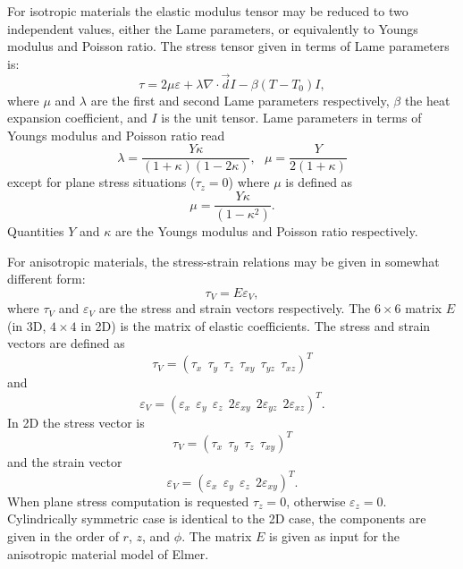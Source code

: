 \begin{versiona}
For isotropic materials the elastic modulus tensor may be reduced to
two independent values, either the Lame parameters, or equivalently
to Youngs modulus and Poisson ratio. The stress tensor given 
in terms of Lame parameters is:
\begin{equation}
\tau = 2 \mu \varepsilon + \lambda\nabla\cdot\Vec{d} I - \beta(T-T_0)I,
\end{equation}
where $\mu$ and $\lambda$ are the first and second Lame parameters respectively,
$\beta$ the heat expansion coefficient,
and $I$ is the unit tensor. Lame parameters in terms of Youngs modulus and
Poisson ratio read
\begin{equation}
 \lambda = \frac{Y \kappa}{( 1 + \kappa ) ( 1-2\kappa )},\ \ \  
 \mu = \frac{Y}{2(1+\kappa)}
\end{equation}
except for plane stress situations ($\tau_z=0$) where $\mu$ is defined as
\begin{equation}
 \mu = \frac{Y \kappa}{( 1 - \kappa^2 ) }.
\end{equation}
Quantities $Y$ and $\kappa$ are the Youngs modulus and Poisson ratio respectively.

For anisotropic materials, the stress-strain relations may be given in somewhat different
form:
\begin{equation}
\tau_V = E \varepsilon_V,
\end{equation}
where $\tau_V$ and $\varepsilon_V$ are the stress and strain vectors respectively.
The $6\times6$ matrix $E$ (in 3D, $4\times4$ in 2D) is the matrix of elastic
coefficients. The stress and strain vectors are defined as
\begin{equation}
\tau_V = \left( \tau_x\ \ \tau_y\ \ \tau_z\ \ \tau_{xy}\ \ \tau_{yz}\ \ \tau_{xz} \right)^T
\end{equation}
and
\begin{equation}
\varepsilon_V = \left( \varepsilon_x\ \ \varepsilon_y\ \ \varepsilon_z\ \  
2\varepsilon_{xy}\ \ 2\varepsilon_{yz}\ \ 2\varepsilon_{xz} \right)^T.
\end{equation}
In 2D the stress vector is
\begin{equation}
\tau_V = \left( \tau_x\ \ \tau_y\ \ \tau_z\ \ \tau_{xy} \right)^T
\end{equation}
and the strain vector
\begin{equation}
\varepsilon_V = \left( \varepsilon_x\ \ \varepsilon_y\ \ \varepsilon_z\ \ 2\varepsilon_{xy}\right)^T.
\end{equation}
When plane stress computation is requested  $\tau_z=0$, otherwise $\varepsilon_z=0$.
Cylindrically symmetric case is identical to the 2D case, the components are given
in the order of $r$, $z$, and $\phi$. The matrix $E$ is given as input for
the anisotropic material model of Elmer.


\end{versiona}
